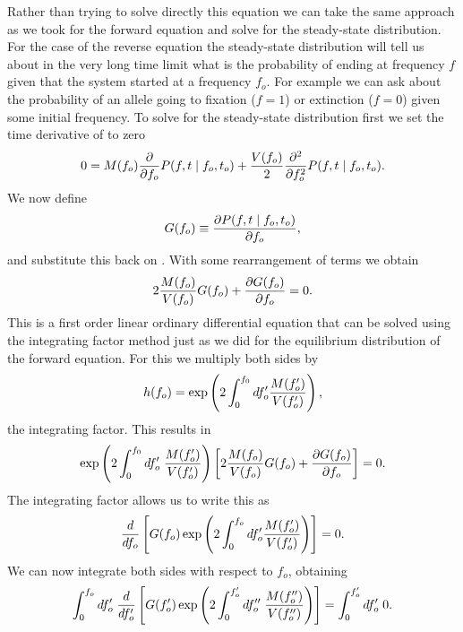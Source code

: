 Rather than trying to solve directly this equation we can take the same
approach as we took for the forward equation and solve for the steady-state
distribution. For the case of the reverse equation the steady-state
distribution will tell us about in the very long time limit what is the
probability of ending at frequency $f$ given that the system started at a
frequency $f_o$. For example we can ask about the probability of an allele
going to fixation ($f = 1$) or extinction ($f = 0$) given some initial
frequency. To solve for the steady-state distribution first we set the time
derivative of  to zero
\begin{equation}
	0 = M(f_o) {\partial \over \partial f_o}P(f, t \mid f_o, t_o) +
	{V(f_o) \over 2} {\partial^2 \over \partial f_o^2} P(f, t \mid f_o, t_o).
	\label{eq_kolmogorov_backward_rev}
\end{equation}
We now define
\begin{equation}
	G(f_o) \equiv {\partial P(f, t \mid f_o, t_o) \over \partial f_o},
\end{equation}
and substitute this back on . With some
rearrangement of terms we obtain
\begin{equation}
	2 {M(f_o) \over V(f_o)} G(f_o) + {\partial G(f_o) \over \partial f_o} = 0.
\end{equation}
This is a first order linear ordinary differential equation that can be solved
using the integrating factor method just as we did for the equilibrium
distribution of the forward equation. For this we multiply both sides by
\begin{equation}
	h(f_o) = \exp \left( 2 \int_0^{f_0} df_o' {M(f_o') \over V(f_o')} \right),
\end{equation}
the integrating factor. This results in
\begin{equation}
	\exp \left( 2 \int_0^{f_0} df_o'\; {M(f_o') \over V(f_o')} \right)
	\left[
	2 {M(f_o) \over V(f_o)} G(f_o) + {\partial G(f_o) \over \partial f_o}
	\right] = 0.
\end{equation}
The integrating factor allows us to write this as
\begin{equation}
	{d \over df_o} \left[
	G(f_o) \exp \left(
	2 \int_0^{f_o} df_o' {M(f_o') \over V(f_o')}
	\right)
	\right] = 0.
\end{equation}
We can now integrate both sides with respect to $f_o$, obtaining
\begin{equation}
	\int_0^{f_o} df_o' \; {d \over df_o'} \left[
	G(f_o') \exp \left(
	2 \int_0^{f_o'} df_o'' \; {M(f_o'') \over V(f_o'')}
	\right)	\right] = \int_0^{f_o'} df_o' \; 0.
\end{equation}
